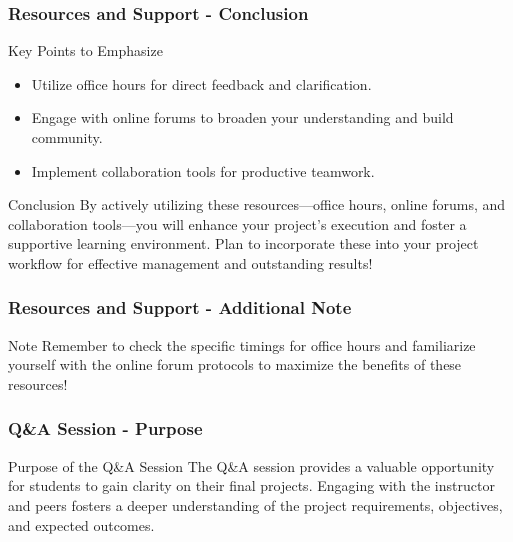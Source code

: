 \documentclass[aspectratio=169]{beamer}
\begin{document}
\begin{frame}[fragile]
    \frametitle{Resources and Support - Conclusion}
    \begin{block}{Key Points to Emphasize}
        \begin{itemize}
            \item Utilize office hours for direct feedback and clarification.
            \item Engage with online forums to broaden your understanding and build community.
            \item Implement collaboration tools for productive teamwork.
        \end{itemize}
    \end{block}
    \begin{block}{Conclusion}
        By actively utilizing these resources—office hours, online forums, and collaboration tools—you will enhance your project's execution and foster a supportive learning environment. Plan to incorporate these into your project workflow for effective management and outstanding results!
    \end{block}
\end{frame}

\begin{frame}[fragile]
    \frametitle{Resources and Support - Additional Note}
    \begin{block}{Note}
        Remember to check the specific timings for office hours and familiarize yourself with the online forum protocols to maximize the benefits of these resources!
    \end{block}
\end{frame}

\begin{frame}[fragile]
    \frametitle{Q\&A Session - Purpose}
    \begin{block}{Purpose of the Q\&A Session}
        The Q\&A session provides a valuable opportunity for students to gain clarity on their final projects. 
        Engaging with the instructor and peers fosters a deeper understanding of the project requirements, objectives, and expected outcomes.
    \end{block}
\end{frame}
\end{document}

